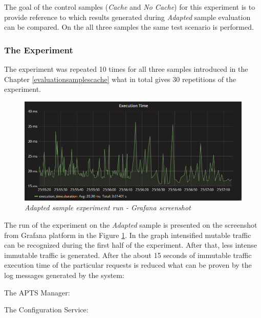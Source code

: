 \documentclass[12pt,a4paper]{article}
\begin{document}
The goal of the control samples (\textit{Cache} and \textit{No Cache}) for this experiment is to provide reference to which results generated during \textit{Adapted} sample evaluation can be compared. On the all three samples the same test scenario is performed. 



\subsubsection{The Experiment} 

The experiment was repeated 10 times for all three samples introduced in the Chapter \ref{evaluationsamplescache} what in total gives 30 repetitions of the experiment.

\begin{figure}[!htb]
\centering
\includegraphics[width=1\textwidth]{cacheEval2}
\caption{\textit{Adapted sample experiment run - Grafana screenshot}} \label{figure:cachegraphanascreen}
\end{figure}

The run of the experiment on the \textit{Adapted} sample is presented on the screenshot from Grafana platform in the Figure \ref{figure:cachegraphanascreen}. In the graph intensified mutable traffic can be recognized during the first half of the experiment. After that, less intense immutable traffic is generated. After the about 15 seconds of immutable traffic execution time of the particular requests is reduced what can be proven by the log messages generated by the system:

The APTS Manager:

\noindent{}\vspace{1mm}

The Configuration Service:
\end{document}
